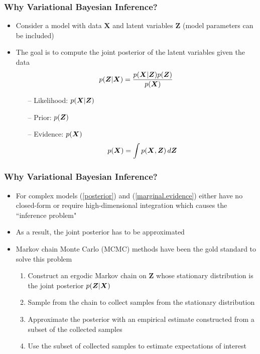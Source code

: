 \documentclass[10pt, compress, notheorems, aspectratio=169]{beamer}
\let\originalleft\left
\let\originalright\right
\renewcommand{\left}{\mathopen{}\mathclose \bgroup \originalleft}
\renewcommand{\right}{\aftergroup \egroup \originalright}
\begin{document}
\begin{frame}
	\frametitle{Why Variational Bayesian Inference?}
	\begin{itemize}
		\item Consider a model with data ${\bm X}$ and latent variables ${\bm Z}$ (model parameters can be included)
		\item The goal is to compute the joint posterior of the latent variables given the data
	  		\begin{equation} \label{posterior}
	  			p \left( {\bm Z} | {\bm X} \right) = \frac{ p \left( {\bm X} | {\bm Z} \right) p \left( {\bm Z} \right) }{ p \left( {\bm X} \right) }
	  		\end{equation}
 		  	\begin{itemize}
	  			\item[--] Likelihood: $p \left( {\bm X} | {\bm Z} \right)$
				\item[--] Prior: $p \left( {\bm Z}\right)$
				\item[--] Evidence: $p \left( {\bm X} \right)$
					\begin{equation} 			
						p \left( {\bm X} \right) = \int p \left( {\bm X}, {\bm Z} \right) \, d{\bm Z} \label{marginal.evidence}
					\end{equation}
			\end{itemize}
	\end{itemize}
	
\end{frame}

\begin{frame}
	\frametitle{Why Variational Bayesian Inference?}
	\begin{itemize}
		\item For complex models (\ref{posterior}) and (\ref{marginal.evidence}) either have no closed-form or require high-dimensional integration which causes the ``inference problem"
		\item As a result, the joint posterior has to be approximated
		\item Markov chain Monte Carlo (MCMC) methods have been the gold standard to solve this problem
			\begin{enumerate}
				\item Construct an ergodic Markov chain on $\bm Z$ whose stationary distribution is the joint posterior $p \left( {\bm Z} | {\bm X} \right)$
				\item Sample from the chain to collect samples from the stationary distribution
				\item Approximate the posterior with an empirical estimate constructed from a subset of the collected samples
				\item Use the subset of collected samples to estimate expectations of interest
			\end{enumerate}
	\end{itemize}
\end{frame}
\end{document}
